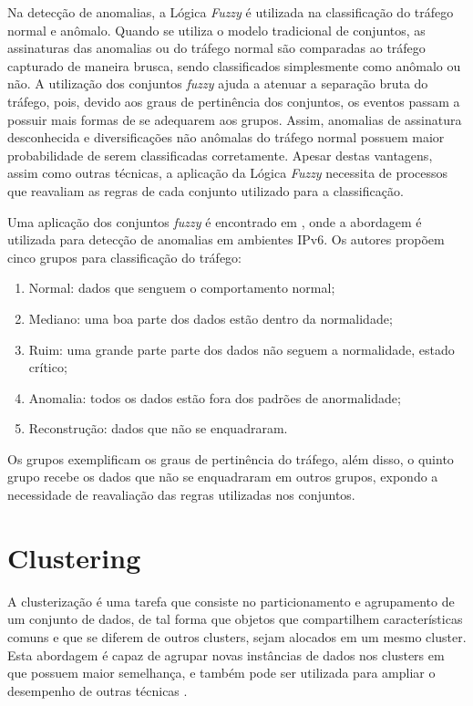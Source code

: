 \indent Na detecção de anomalias, a Lógica \textit{Fuzzy} é utilizada na classificação do tráfego normal e anômalo. Quando se utiliza o modelo tradicional de conjuntos, as assinaturas das anomalias ou do tráfego normal são comparadas ao tráfego capturado de maneira brusca, sendo classificados simplesmente como anômalo ou não. A utilização dos conjuntos \textit{fuzzy} ajuda a atenuar a separação bruta do tráfego, pois, devido aos graus de pertinência dos conjuntos, os eventos passam a possuir mais formas de se adequarem aos grupos. Assim, anomalias de assinatura desconhecida e diversificações não anômalas do tráfego normal possuem maior probabilidade de serem classificadas corretamente. Apesar destas vantagens, assim como outras técnicas, a aplicação da Lógica \textit{Fuzzy} necessita de processos que reavaliam as regras de cada conjunto utilizado para a classificação.

\indent Uma aplicação dos conjuntos \textit{fuzzy} é encontrado em , onde a abordagem é utilizada  para detecção de anomalias em ambientes IPv6. Os autores propõem cinco grupos para classificação do tráfego:
\begin{enumerate}
  \item Normal: dados que senguem o comportamento normal;
  \item Mediano: uma boa parte dos dados estão dentro da normalidade;
  \item Ruim: uma grande parte parte dos dados não seguem a normalidade, estado crítico;
  \item Anomalia: todos os dados estão fora dos padrões de anormalidade;
  \item Reconstrução: dados que não se enquadraram.
\end{enumerate}

\indent Os grupos exemplificam os graus de pertinência do tráfego, além disso, o quinto grupo recebe os dados que não se enquadraram em outros grupos, expondo a necessidade de reavaliação das regras utilizadas nos conjuntos.

  \section{Clustering}
\indent A clusterização é uma tarefa que consiste no particionamento e agrupamento de um conjunto de dados, de tal forma que objetos que compartilhem características comuns e que se diferem de outros clusters, sejam alocados em um mesmo cluster. Esta abordagem é capaz de agrupar novas instâncias de dados nos clusters em que possuem maior semelhança, e também pode ser utilizada para ampliar o desempenho de outras técnicas \cite{rehman2009}.

